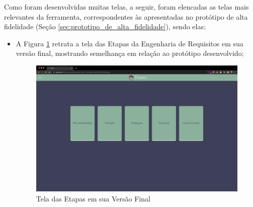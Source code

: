 Como foram desenvolvidas muitas telas, a seguir, foram elencadas as telas mais relevantes da ferramenta, correspondentes às apresentadas no protótipo de alta fidelidade (Seção \ref{sec:prototipo_de_alta_fidelidade}), sendo elas:

\begin{itemize}
    \item A Figura \ref{fig:etapas_implementado} retrata a tela das Etapas da Engenharia de Requisitos em sua versão final, mostrando semelhança em relação ao protótipo desenvolvido;
    \begin{figure}[]
      \begin{center}
          \caption{{Tela das Etapas em sua Versão Final}}
          \label{fig:etapas_implementado}
          \includegraphics[scale=0.24]{figuras/TelasDesenvolvidas/etapas-implementado.png}
    \end{center}
    \end{figure}
    

\end{itemize}
